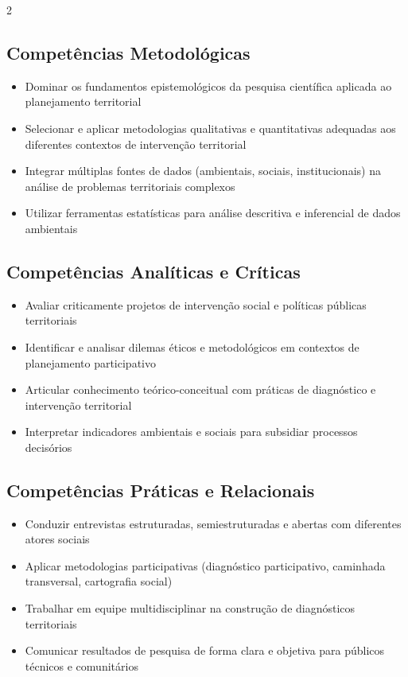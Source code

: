 \documentclass[11pt,a4paper]{article}
\begin{document}
\begin{multicols}{2}
\subsection*{Competências Metodológicas}
\begin{itemize}
\item Dominar os fundamentos epistemológicos da pesquisa científica aplicada ao planejamento territorial
\item Selecionar e aplicar metodologias qualitativas e quantitativas adequadas aos diferentes contextos de intervenção territorial
\item Integrar múltiplas fontes de dados (ambientais, sociais, institucionais) na análise de problemas territoriais complexos
\item Utilizar ferramentas estatísticas para análise descritiva e inferencial de dados ambientais
\end{itemize}

\subsection*{Competências Analíticas e Críticas}
\begin{itemize}
\item Avaliar criticamente projetos de intervenção social e políticas públicas territoriais
\item Identificar e analisar dilemas éticos e metodológicos em contextos de planejamento participativo
\item Articular conhecimento teórico-conceitual com práticas de diagnóstico e intervenção territorial
\item Interpretar indicadores ambientais e sociais para subsidiar processos decisórios
\end{itemize}

\columnbreak

\subsection*{Competências Práticas e Relacionais}
\begin{itemize}
\item Conduzir entrevistas estruturadas, semiestruturadas e abertas com diferentes atores sociais
\item Aplicar metodologias participativas (diagnóstico participativo, caminhada transversal, cartografia social)
\item Trabalhar em equipe multidisciplinar na construção de diagnósticos territoriais
\item Comunicar resultados de pesquisa de forma clara e objetiva para públicos técnicos e comunitários
\end{itemize}


\end{multicols}
\end{document}
